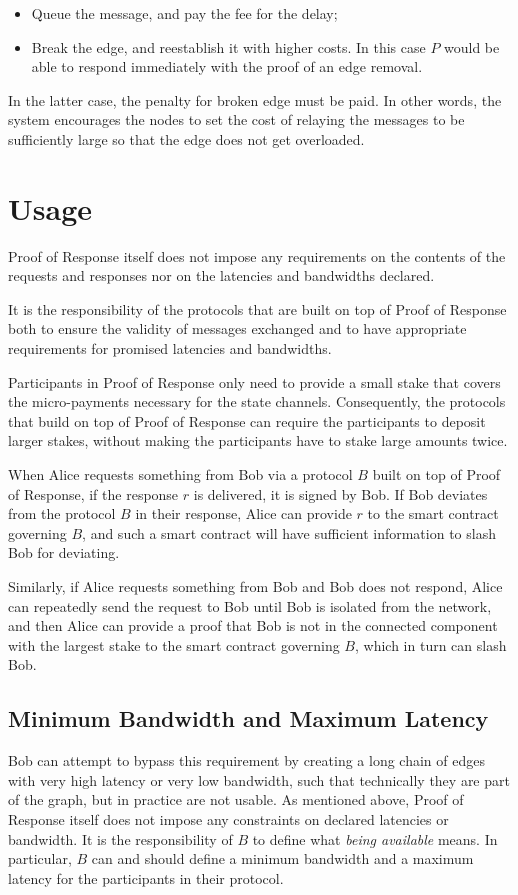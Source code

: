 \documentclass{article}
\begin{document}
\begin{itemize}
    \item Queue the message, and pay the fee for the delay;
    \item Break the edge, and reestablish it with higher costs. In this case \( P \) would be able to respond immediately with the proof of an edge removal.
\end{itemize}

In the latter case, the penalty for broken edge must be paid. In other words, the system encourages the nodes to set the cost of relaying the messages to be sufficiently large so that the edge does not get overloaded.

\section{Usage}

Proof of Response itself does not impose any requirements on the contents of the requests and responses nor on the latencies and bandwidths declared.

It is the responsibility of the protocols that are built on top of Proof of Response both to ensure the validity of messages exchanged and to have appropriate requirements for promised latencies and bandwidths.

Participants in Proof of Response only need to provide a small stake that covers the micro-payments necessary for the state channels. Consequently, the protocols that build on top of Proof of Response can require the participants to deposit larger stakes, without making the participants have to stake large amounts twice.

When Alice requests something from Bob via a protocol $B$ built on top of Proof of Response, if the response $r$ is delivered, it is signed by Bob. If Bob deviates from the protocol $B$ in their response, Alice can provide $r$ to the smart contract governing $B$, and such a smart contract will have sufficient information to slash Bob for deviating.

Similarly, if Alice requests something from Bob and Bob does not respond, Alice can repeatedly send the request to Bob until Bob is isolated from the network, and then Alice can provide a proof that Bob is not in the connected component with the largest stake to the smart contract governing $B$, which in turn can slash Bob.

\subsection{Minimum Bandwidth and Maximum Latency}\label{subsection-min-bandwidth-max-latency}
Bob can attempt to bypass this requirement by creating a long chain of edges with very high latency or very low bandwidth, such that technically they are part of the graph, but in practice are not usable. As mentioned above, Proof of Response itself does not impose any constraints on declared latencies or bandwidth. It is the responsibility of $B$ to define what \textit{being available} means. In particular, $B$ can and should define a minimum bandwidth and a maximum latency for the participants in their protocol.
\end{document}
